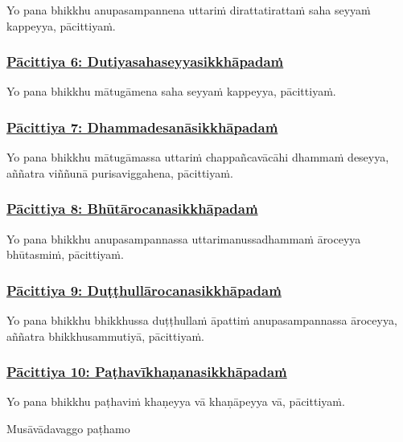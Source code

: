 Yo pana bhikkhu anupasampannena uttariṁ dirattatirattaṁ saha seyyaṁ kappeyya, pācittiyaṁ.



\subsubsection*{\hyperref[exp6]{Pācittiya 6: Dutiyasahaseyyasikkhāpadaṁ}}
\label{pac6}

Yo pana bhikkhu mātugāmena saha seyyaṁ kappeyya, pācittiyaṁ.



\subsubsection*{\hyperref[exp7]{Pācittiya 7: Dhammadesanāsikkhāpadaṁ}}
\label{pac7}

Yo pana bhikkhu mātugāmassa uttariṁ chappañcavācāhi dhammaṁ deseyya, aññatra viññunā purisaviggahena, pācittiyaṁ.



\subsubsection*{\hyperref[exp8]{Pācittiya 8: Bhūtārocanasikkhāpadaṁ}}
\label{pac8}

Yo pana bhikkhu anupasampannassa uttarimanussadhammaṁ āroceyya bhūtasmiṁ, pācittiyaṁ.



\subsubsection*{\hyperref[exp9]{Pācittiya 9: Duṭṭhullārocanasikkhāpadaṁ}}
\label{pac9}

Yo pana bhikkhu bhikkhussa duṭṭhullaṁ āpattiṁ anupasampannassa āroceyya, aññatra bhikkhusammutiyā, pācittiyaṁ.



\subsubsection*{\hyperref[exp10]{Pācittiya 10: Paṭhavīkhaṇanasikkhāpadaṁ}}
\label{pac10}

Yo pana bhikkhu paṭhaviṁ khaṇeyya vā khaṇāpeyya vā, pācittiyaṁ.

\begin{center}
	Musāvādavaggo paṭhamo
\end{center}



